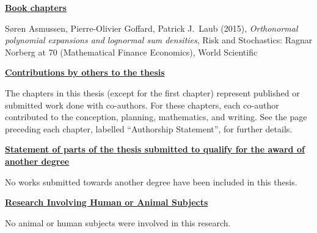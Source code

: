 {\small \bf \underline{Book chapters}}

S{\o}ren Asmussen, Pierre-Olivier Goffard, Patrick J.\ Laub (2015), \emph{Orthonormal polynomial expansions and lognormal sum densities}, Risk and Stochastics: Ragnar Norberg at 70 (Mathematical Finance Economics), World Scientific

{\bf \underline{Contributions by others to the thesis}}

The chapters in this thesis (except for the first chapter) represent published or submitted work done with co-authors. For these chapters, each co-author contributed to the conception, planning, mathematics, and writing. See the page preceding each chapter, labelled ``Authorship Statement'', for further details.

\newpage
{\bf \underline{Statement of parts of the thesis submitted to qualify for
the award of} \\
\underline{another degree}}

No works submitted towards another degree have been included in this thesis.

{\bf \underline{Research Involving Human or Animal Subjects}}

No animal or human subjects were involved in this research.










